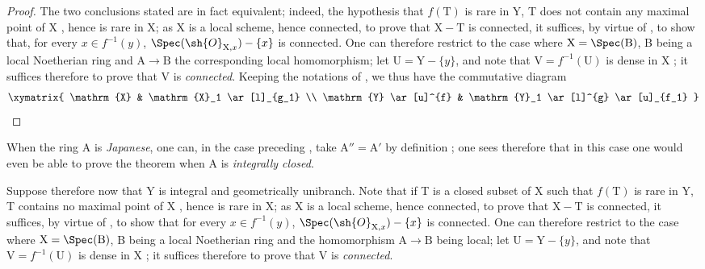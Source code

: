 \begin{proof}
The two conclusions stated are in fact equivalent;
indeed, the hypothesis that $f(\mathrm{T})$ is rare in Y, T does not contain any maximal point of X , hence is rare in X;
as X is a local scheme, hence connected, to prove that $\mathrm{X}-\mathrm{T}$ is connected, it suffices, by virtue of , to show that, for every $x\in f^{-1}(y)$, $\Spec(\sh{O}_{\mathrm{X},x})-\{x\}$ is connected.
One can therefore restrict to the case where $\mathrm{X}=\Spec(\mathrm{B})$, B being a local Noetherian ring and $\mathrm{A}\to\mathrm{B}$ the corresponding local homomorphism;
let $\mathrm{U}=\mathrm{Y}-\{y\}$, and note that $\mathrm{V}=f^{-1}(\mathrm{U})$ is dense in X ;
it suffices therefore to prove that V is \emph{connected}.
Keeping the notations of , we thus have the commutative diagram
\[
  \xymatrix{
    \mathrm{X} & \mathrm{X}_1 \ar[l]_{g_1} \\
    \mathrm{Y} \ar[u]^{f} & \mathrm{Y}_1 \ar[l]^{g} \ar[u]_{f_1}
  }
\]
\end{proof}

\begin{remark}[18.9.7.1]
\label{IV.18.9.7.1}
When the ring A is \emph{Japanese}, one can, in the case preceding , take $\mathrm{A}''=\mathrm{A}'$ by definition ;
one sees therefore that in this case one would even be able to prove the theorem when A is \emph{integrally closed}.
\end{remark}

\begin{env}[18.9.7.2]
\label{IV.18.9.7.2}
Suppose therefore now that Y is integral and geometrically unibranch.
Note that if T is a closed subset of X such that $f(\mathrm{T})$ is rare in Y, T contains no maximal point of X , hence is rare in X;
as X is a local scheme, hence connected, to prove that $\mathrm{X}-\mathrm{T}$ is connected, it suffices, by virtue of , to show that for every $x\in f^{-1}(y)$, $\Spec(\sh{O}_{\mathrm{X},x})-\{x\}$ is connected.
One can therefore restrict to the case where $\mathrm{X}=\Spec(\mathrm{B})$, B being a local Noetherian ring and the homomorphism $\mathrm{A}\to\mathrm{B}$ being local;
let $\mathrm{U}=\mathrm{Y}-\{y\}$, and note that $\mathrm{V}=f^{-1}(\mathrm{U})$ is dense in X ;
it suffices therefore to prove that V is \emph{connected}.
\end{env}

